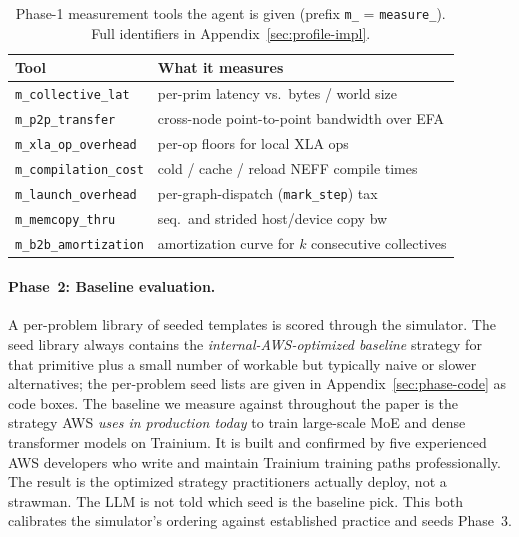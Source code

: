\begin{table}[!htbp]
\centering\footnotesize
\setlength{\tabcolsep}{3pt}
\setlength{\abovecaptionskip}{2pt}
\setlength{\belowcaptionskip}{0pt}
\begin{tabular}{ll}
\toprule
\textbf{Tool} & \textbf{What it measures} \\
\midrule
\texttt{m\_collective\_lat}   & per-prim latency vs.\ bytes / world size \\
\texttt{m\_p2p\_transfer}     & cross-node point-to-point bandwidth over EFA \\
\texttt{m\_xla\_op\_overhead} & per-op floors for local XLA ops \\
\texttt{m\_compilation\_cost} & cold / cache / reload NEFF compile times \\
\texttt{m\_launch\_overhead}  & per-graph-dispatch (\texttt{mark\_step}) tax \\
\texttt{m\_memcopy\_thru}     & seq.\ and strided host/device copy bw \\
\texttt{m\_b2b\_amortization} & amortization curve for $k$ consecutive collectives \\
\bottomrule
\end{tabular}
\caption{Phase-1 measurement tools the agent is given (prefix
\texttt{m\_} = \texttt{measure\_}). Full identifiers in
Appendix~\ref{sec:profile-impl}.}
\label{tab:probe-tools}
\end{table}

\paragraph{Phase~2: Baseline evaluation.}
A per-problem library of seeded templates is scored through the
simulator. The seed library always contains the
\emph{internal-AWS-optimized baseline} strategy for that
primitive plus a small number of workable but typically naive or
slower alternatives; the per-problem seed lists are given in
Appendix~\ref{sec:phase-code} as code boxes. The baseline we
measure against throughout the paper is the strategy AWS
\emph{uses in production today} to train large-scale MoE and dense
transformer models on Trainium. It is built and confirmed by five
experienced AWS developers who write and maintain Trainium
training paths professionally. The result is the optimized
strategy practitioners actually deploy, not a strawman. The LLM
is not told which seed is the baseline pick. This both calibrates
the simulator's ordering against established practice and seeds
Phase~3.

